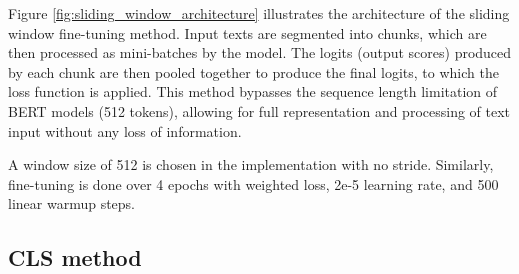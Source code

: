 Figure \ref{fig:sliding_window_architecture} illustrates the architecture of the sliding window fine-tuning method. Input texts are segmented into chunks, which are then processed as mini-batches by the model. The logits (output scores) produced by each chunk are then pooled together to produce the final logits, to which the loss function is applied. This method bypasses the sequence length limitation of BERT models (512 tokens), allowing for full representation and processing of text input without any loss of information.

A window size of 512 is chosen in the implementation with no stride. Similarly, fine-tuning is done over 4 epochs with weighted loss, 2e-5 learning rate, and 500 linear warmup steps.

\subsection{CLS method}


